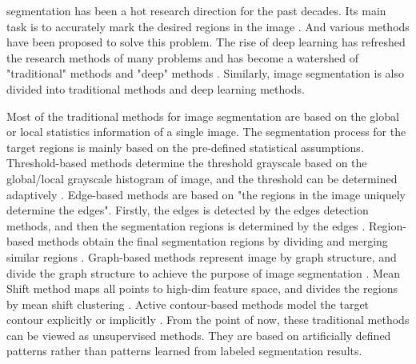  segmentation has been a hot research direction for the past decades. Its main task is to accurately mark the desired regions in the image \cite{Introduction:pal1993review}. And various methods have been proposed to solve this problem. The rise of deep learning has refreshed the research methods of many problems and has become a watershed of "traditional" methods and "deep" methods \cite{Introduction:lecun2015deep}. Similarly, image segmentation is also divided into traditional methods and deep learning methods.

Most of the traditional methods for image segmentation are based on the global or local statistics information of a single image. The segmentation process for the target regions is mainly based on the pre-defined statistical assumptions. Threshold-based methods determine the threshold grayscale based on the global/local grayscale histogram of image, and the threshold can be determined adaptively \cite{Introduction:traditional:threshold:sezgin2004survey}. Edge-based methods are based on "the regions in the image uniquely determine the edges". Firstly, the edges is detected by the edges detection methods, and then the segmentation regions is determined by the edges \cite{Introduction:traditional:edge:senthilkumaran2009edge}. Region-based methods obtain the final segmentation regions by dividing and merging similar regions \cite{Introduction:traditional:watershed:nguyen2003watersnakes} \cite{LevelSet:superpixels:achanta2012slic}. Graph-based methods represent image by graph structure, and divide the graph structure to achieve the purpose of image segmentation \cite{Introduction:traditional:graph:felzenszwalb2004efficient}. Mean Shift method maps all points to high-dim feature space, and divides the regions by mean shift clustering \cite{Introduction:traditional:meanShift:comaniciu2002mean}. Active contour-based methods model the target contour explicitly \cite{Introduction:traditional:snakes:kass1988snakes} or implicitly \cite{LevelSet:chan2001active}. From the point of now, these traditional methods can be viewed as unsupervised methods. They are based on artificially defined patterns rather than patterns learned from labeled segmentation results.


